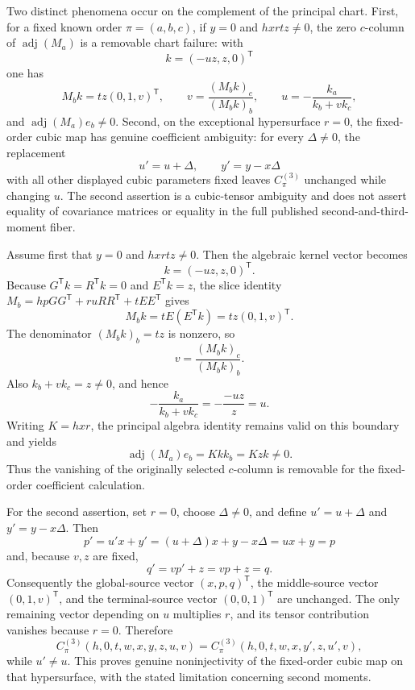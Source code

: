 Two distinct phenomena occur on the complement of the principal chart.  First, for a fixed known order \(\pi=(a,b,c)\), if \(y=0\) and \(hxrtz\ne0\), the zero \(c\)-column of \(\operatorname{adj}(M_a)\) is a removable chart failure: with
\[
k=(-uz,z,0)^{\mathsf T}
\]
one has
\[
M_bk=tz(0,1,v)^{\mathsf T},
\qquad
v=\frac{(M_bk)_c}{(M_bk)_b},
\qquad
u=-\frac{k_a}{k_b+vk_c},
\]
and \(\operatorname{adj}(M_a)e_b\ne0\).  Second, on the exceptional hypersurface \(r=0\), the fixed-order cubic map has genuine coefficient ambiguity: for every \(\Delta\ne0\), the replacement
\[
u'=u+\Delta,
\qquad
y'=y-x\Delta
\]
with all other displayed cubic parameters fixed leaves \(C_{\pi}^{(3)}\) unchanged while changing \(u\).  The second assertion is a cubic-tensor ambiguity and does not assert equality of covariance matrices or equality in the full published second-and-third-moment fiber.

Assume first that \(y=0\) and \(hxrtz\ne0\).  Then the algebraic kernel vector becomes
\[
k=(-uz,z,0)^{\mathsf T}.
\]
Because \(G^{\mathsf T}k=R^{\mathsf T}k=0\) and \(E^{\mathsf T}k=z\), the slice identity
\(M_b=hpGG^{\mathsf T}+ruRR^{\mathsf T}+tEE^{\mathsf T}\) gives
\[
M_bk=tE(E^{\mathsf T}k)=tz(0,1,v)^{\mathsf T}.
\]
The denominator \((M_bk)_b=tz\) is nonzero, so
\[
v=\frac{(M_bk)_c}{(M_bk)_b}.
\]
Also \(k_b+vk_c=z\ne0\), and hence
\[
-\frac{k_a}{k_b+vk_c}=-\frac{-uz}{z}=u.
\]
Writing \(K=hxr\), the principal algebra identity remains valid on this boundary and yields
\[
\operatorname{adj}(M_a)e_b=Kk k_b=Kzk\ne0.
\]
Thus the vanishing of the originally selected \(c\)-column is removable for the fixed-order coefficient calculation.

For the second assertion, set \(r=0\), choose \(\Delta\ne0\), and define \(u'=u+\Delta\) and \(y'=y-x\Delta\).  Then
\[
p'=u'x+y'=(u+\Delta)x+y-x\Delta=ux+y=p
\]
and, because \(v,z\) are fixed,
\[
q'=vp'+z=vp+z=q.
\]
Consequently the global-source vector \((x,p,q)^{\mathsf T}\), the middle-source vector \((0,1,v)^{\mathsf T}\), and the terminal-source vector \((0,0,1)^{\mathsf T}\) are unchanged.  The only remaining vector depending on \(u\) multiplies \(r\), and its tensor contribution vanishes because \(r=0\).  Therefore
\[
C_{\pi}^{(3)}(h,0,t,w,x,y,z,u,v)
=C_{\pi}^{(3)}(h,0,t,w,x,y',z,u',v),
\]
while \(u'\ne u\).  This proves genuine noninjectivity of the fixed-order cubic map on that hypersurface, with the stated limitation concerning second moments.

